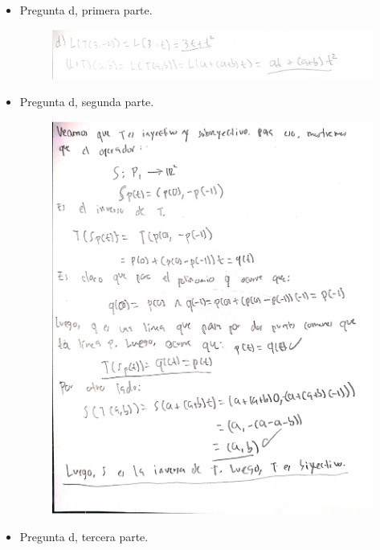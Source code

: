 \documentclass[fleqn]{article}
\begin{document}
\begin{enumerate}
\begin{itemize}
         \item Pregunta d, primera parte.
           \begin{figure}[H]
             \centering \includegraphics[scale=.5]{figs/3d1}
           \end{figure}
           \newpage
         \item Pregunta d, segunda parte.
           \begin{figure}[H]
             \centering \includegraphics[scale=.8]{figs/3d2}
           \end{figure}
           \newpage
         \item Pregunta d, tercera parte.
           \begin{figure}[H]

\end{figure}
\end{itemize}
\end{enumerate}
\end{document}
